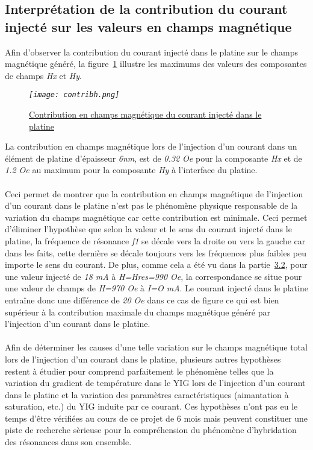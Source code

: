 \documentclass[12pt,fleqn]{book} %
\begin{document}
\subsection{Interprétation de la contribution du courant injecté sur les valeurs en champs magnétique }
\noindent Afin d'observer la contribution du courant injecté dans le platine sur le champs magnétique généré, la figure~\underline{\color{blue}\ref{contribh}} illustre les maximums des valeurs des composantes de champs \emph{Hx} et \emph{Hy}.
\begin{figure}[H]
	\centering
	\itshape
	\texttt{[image: contribh.png]}
	\caption{\label{contribh} \underline{Contribution en champs magnétique du courant injecté dans le platine}}
\end{figure}
\noindent La contribution en champs magnétique lors de l'injection d'un courant dans un élément de platine d'épaisseur \emph{6nm}, est de \emph{0.32 Oe} pour la composante \emph{Hx} et de \emph{1.2 Oe} au maximum pour la composante \emph{Hy} à l'interface du platine.
~\\\\Ceci permet de montrer que la contribution en champs magnétique de l'injection d'un courant dans le platine n'est pas le phénomène physique responsable de la variation du champs magnétique car cette contribution est minimale. Ceci permet d'éliminer l'hypothèse que selon la valeur et le sens du courant injecté dans le platine, la fréquence de résonance \emph{f1} se décale vers la droite ou vers la gauche car dans les faits, cette dernière se décale toujours vers les fréquences plus faibles peu importe le sens du courant.
De plus, comme cela a été vu dans la partie~\underline{\color{blue}3.2}, pour une valeur injecté de \emph{18 mA} à \emph{H=Hres=990 Oe}, la correspondance se situe pour une valeur de champs de \emph{H=970 Oe} à \emph{I=O mA}. Le courant injecté dans le platine entraîne donc une différence de \emph{20 Oe} dans ce cas de figure ce qui est bien supérieur à la contribution maximale du champs magnétique généré par l'injection d'un courant dans le platine.
~\\\\Afin de déterminer les causes d'une telle variation sur le champs magnétique total lors de l'injection d'un courant dans le platine, plusieurs autres hypothèses restent à étudier pour comprend parfaitement le phénomène telles que la variation du gradient de température dans le YIG lors de l'injection d'un courant dans le platine et la variation des paramètres caractéristiques (aimantation à saturation, etc.) du YIG induite par ce courant. Ces hypothèses n'ont pas eu le temps d'être vérifiées au cours de ce projet de 6 mois mais peuvent constituer une piste de recherche sèrieuse pour la compréhension
du phénomène d'hybridation des résonances dans son ensemble.
\end{document}
